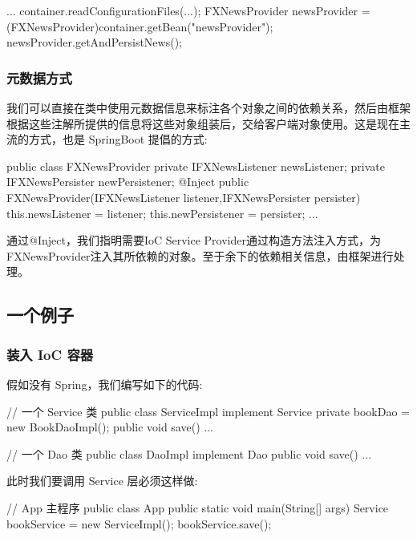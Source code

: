 \begin{Java}
... 
container.readConfigurationFiles(...); 
FXNewsProvider newsProvider = (FXNewsProvider)container.getBean("newsProvider"); 
newsProvider.getAndPersistNews(); 
\end{Java}

\subsubsection*{元数据方式}

我们可以直接在类中使用元数据信息来标注各个对象之间的依赖关系，然后由框架根据这些注解所提供的信息将这些对象组装后，交给客户端对象使用。这是现在主流的方式，也是 SpringBoot 提倡的方式:

\begin{Java}
public class FXNewsProvider { 
    private IFXNewsListener  newsListener;
    private IFXNewsPersister newPersistener;
    @Inject
    public FXNewsProvider(IFXNewsListener listener,IFXNewsPersister persister) {
        this.newsListener   = listener;
        this.newPersistener = persister;
    }    
    ...  
} 
\end{Java}

通过@Inject，我们指明需要IoC Service Provider通过构造方法注入方式，为FXNewsProvider注入其所依赖的对象。至于余下的依赖相关信息，由框架进行处理。

\subsection*{一个例子}

\subsubsection*{装入 IoC 容器}

假如没有 Spring，我们编写如下的代码:

\begin{Java}
// 一个 Service 类
public class ServiceImpl implement Service {
    private bookDao = new BookDaoImpl();
    public void save() { ... }
}

// 一个 Dao 类
public class DaoImpl implement Dao {
    public void save() { ... }
}
\end{Java}


此时我们要调用 Service 层必须这样做:

\begin{Java}
// App 主程序
public class App {
    public static void main(String[] args) {
        Service bookService = new ServiceImpl();
        bookService.save();
    }
}
\end{Java}

